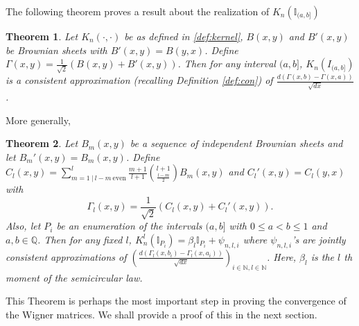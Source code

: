 \documentclass[reqno,12pt]{amsart}
\theoremstyle{plain}
\newtheorem{theorem}{Theorem}
\theoremstyle{definition}
\begin{document}
The following theorem proves a result about the realization of $K_{n}\left(\mathbb{I}_{(a,b]}\right)$
\begin{theorem}
Let $K_{n}(\cdot, \cdot)$ be as defined in \eqref{def:kernel}, $B(x,y)$ and $B'(x,y)$ be Brownian sheets with $B'(x,y)=B(y,x)$. Define $\Gamma(x,y)= \frac{1}{\sqrt{2}}\left( B(x,y) + B'(x,y) \right)$. Then for any interval $(a,b]$, $K_{n}(I_{(a,b]})$ is a consistent approximation (recalling Definition \ref{def:con}) of $\frac{d\left(\Gamma(x,b)-\Gamma(x,a)\right)}{\sqrt{dx}}$.
\end{theorem}
More generally, 
\begin{theorem}\label{thm:joinopconv}
Let $B_{m}(x,y)$ be a sequence of independent Brownian sheets and let $B_{m}'(x,y)=B_{m}(x,y)$. Define $C_{l}(x,y)= \sum_{m=1~|~ l-m ~ \text{even}}^{l}\frac{m+1}{l+1}\binom{l+1}{\frac{l-m}{2}}B_{m}(x,y)$ and $C_{l}'(x,y)= C_{l}(y,x)$ with $$\Gamma_{l}(x,y)= \frac{1}{\sqrt{2}} \left( C_{l}(x,y)+ C_{l}'(x,y) \right).$$ Also, let $P_{i}$ be an enumeration of the intervals $(a,b]$ with $0\le a<b \le 1$ and $a,b \in \mathbb{Q}$. Then for any fixed $l$, 
$K_{n}^{l} \left(\mathbb{I}_{P_{i}}\right)= \beta_{l} \mathbb{I}_{P_{i}} + \psi_{n,l,i}$ where $\psi_{n,l,i}$'s are jointly consistent approximations of $\left( \frac{d\left( \Gamma_{l}(x,b_{i}) -\Gamma_{l}(x,a_{i})\right)}{\sqrt{dx}}\right)_{i \in \mathbb{N}, l \in \mathbb{N}} $. Here, $\beta_{l}$ is the $l$ th moment of the semicircular law.  
\end{theorem}
This Theorem is perhaps the most important step in proving the convergence of the Wigner matrices. We shall provide a proof of this in the next section.
\end{document}
